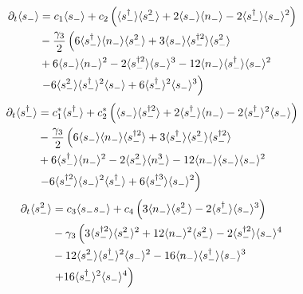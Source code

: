 \begin{align}%
%
%
\partial_t\langle s_- \rangle &= c_1 \langle s_- \rangle + c_2 \left(\langle s_-^\dagger \rangle \langle s_-^2 \rangle + 2 \langle s_- \rangle \langle n_-\rangle - 2 \langle s_-^\dagger \rangle \langle s_- \rangle^2\right) \notag \\
%
&-\frac{\gamma_3}{2}\left(
6 \langle s_-^\dagger \rangle \langle n_- \rangle \langle s_-^2\rangle + 3 \langle s_- \rangle \langle s_-^{\dagger 2} \rangle \langle s_-^2 \rangle \right. \notag \\
%
&+ 6 \langle s_- \rangle \langle n_- \rangle^2 - 2 \langle s_-^{\dagger 2} \rangle \langle s_- \rangle^3 - 12 \langle n_- \rangle \langle s_-^\dagger \rangle \langle s_- \rangle^2 \notag \\
%
&\left. - 6 \langle s_-^2 \rangle \langle s_-^\dagger \rangle^2 \langle s_- \rangle + 6 \langle s_-^\dagger \rangle^2 \langle s_- \rangle^3\right) \notag
\end{align}
\begin{align}
%
%
\partial_t\langle s_-^\dagger \rangle &= c_1^* \langle s_-^\dagger \rangle + c_2^* \left(\langle s_- \rangle \langle s_-^{\dagger 2} \rangle + 2 \langle s_-^\dagger \rangle \langle n_- \rangle - 2 \langle s_-^\dagger \rangle^2\langle s_- \rangle \right) \notag \\
%
&-\frac{\gamma_3}{2}\left(6 \langle s_- \rangle \langle n_- \rangle \langle s_-^{\dagger 2}\rangle + 3 \langle s_-^\dagger \rangle \langle s_-^2 \rangle \langle s_-^{\dagger 2}\rangle \notag \right. \notag \\
%
&+ 6 \langle s_-^\dagger \rangle \langle n_-\rangle^2 - 2 \langle s_-^2 \rangle \langle n_-^3\rangle - 12 \langle n_- \rangle \langle s_- \rangle \langle s_- \rangle^2 \notag \\
%
&\left. - 6 \langle s_-^{\dagger 2} \rangle \langle s_- \rangle^2 \langle s_-^\dagger \rangle + 6 \langle s_-^{\dagger 3} \rangle \langle s_- \rangle^2 \right) \notag
\end{align}
\begin{align}
%
%
\partial_t\langle s_-^2 \rangle &= c_3 \langle s_- s_- \rangle + c_4 \left( 3 \langle n_- \rangle \langle s_-^2 \rangle  - 2 \langle s_-^\dagger \rangle \langle s_- \rangle^3 \right) \notag \\
%
&- \gamma_3 \left( 3 \langle s_-^{\dagger 2}\rangle \langle s_-^2\rangle^2 + 12 \langle n_- \rangle^2 \langle s_-^2\rangle - 2 \langle s_-^{\dagger 2}\rangle \langle s_- \rangle^4 \right. \notag \\
%
& - 12 \langle s_-^2 \rangle \langle s_-^{\dagger}\rangle^2 \langle s_- \rangle^2 - 16 \langle n_- \rangle \langle s_-^\dagger \rangle \langle s_- \rangle^3 \notag \\
%
&\left. + 16 \langle s_-^\dagger \rangle^2 \langle s_- \rangle^4 \right)\notag
\end{align}
